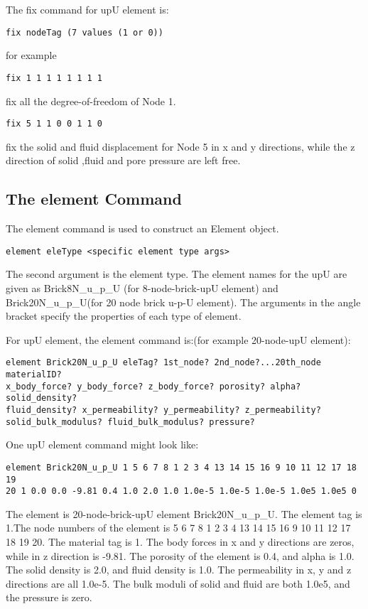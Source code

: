 The fix command for upU element is:
\begin{verbatim}
fix nodeTag (7 values (1 or 0))
\end{verbatim}
for example
\begin{verbatim}
fix 1 1 1 1 1 1 1 1
\end{verbatim}
fix all the degree-of-freedom of Node 1.
\begin{verbatim}
fix 5 1 1 0 0 1 1 0
\end{verbatim}
fix the solid and fluid displacement for Node 5 in x and y directions, while the z direction of solid
,fluid and pore pressure are left free.

\subsection{The element Command}
\label{The element Command}
The element command is used to construct an Element object.
\begin{verbatim}
element eleType <specific element type args>
\end{verbatim}
The second argument is the element type. The element names for the upU are given as Brick8N\_u\_p\_U
(for 8-node-brick-upU element) and Brick20N\_u\_p\_U(for 20 node brick u-p-U element). The arguments in
the angle bracket specify the properties of each type of element.

For upU element, the element command is:(for example 20-node-upU element):
\begin{verbatim}
element Brick20N_u_p_U eleTag? 1st_node? 2nd_node?...20th_node materialID?
x_body_force? y_body_force? z_body_force? porosity? alpha? solid_density?
fluid_density? x_permeability? y_permeability? z_permeability?
solid_bulk_modulus? fluid_bulk_modulus? pressure?
\end{verbatim}
One upU element command might look like:
\begin{verbatim}
element Brick20N_u_p_U 1 5 6 7 8 1 2 3 4 13 14 15 16 9 10 11 12 17 18 19
20 1 0.0 0.0 -9.81 0.4 1.0 2.0 1.0 1.0e-5 1.0e-5 1.0e-5 1.0e5 1.0e5 0
\end{verbatim}
The element is 20-node-brick-upU element Brick20N\_u\_p\_U. The element tag is 1.The node
numbers of the element is 5 6 7 8 1 2 3 4 13 14 15 16 9 10 11 12 17 18 19 20. The material
tag is 1. The body forces in x and y directions are zeros, while in z direction is -9.81.
The porosity of the element is 0.4, and alpha is 1.0. The solid density is 2.0, and fluid
density is 1.0. The permeability in x, y and z directions are all 1.0e-5. The bulk moduli
of solid and  fluid are both 1.0e5, and the pressure is zero.


